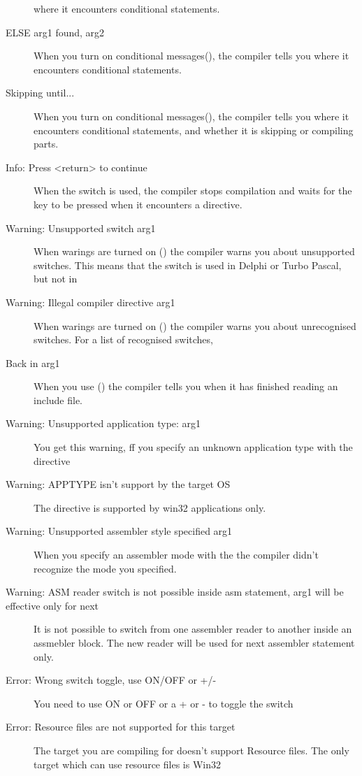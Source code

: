 \begin{description}
 where it encounters conditional statements.
\item [ELSE arg1 found, arg2]
 When you turn on conditional messages(), the compiler tells you
 where it encounters conditional statements.
\item [Skipping until...]
 When you turn on conditional messages(), the compiler tells you
 where it encounters conditional statements, and whether it is skipping or
 compiling parts.
\item [Info: Press <return> to continue]
 When the  switch is used, the compiler stops compilation
 and waits for the  key to be pressed when it encounters
 a  directive.
\item [Warning: Unsupported switch arg1]
 When warings are turned on () the compiler warns you about
 unsupported switches. This means that the switch is used in Delphi or
 Turbo Pascal, but not in \fpc
\item [Warning: Illegal compiler directive arg1]
 When warings are turned on () the compiler warns you about
 unrecognised switches. For a list of recognised switches, \progref
\item [Back in arg1]
 When you use () the compiler tells you when it has finished
 reading an include file.
\item [Warning: Unsupported application type: arg1]
 You get this warning, ff you specify an unknown application type
 with the directive 
\item [Warning: APPTYPE isn't support by the target OS]
 The  directive is supported by win32 applications only.
\item [Warning: Unsupported assembler style specified arg1]
 When you specify an assembler mode with the 
 the compiler didn't recognize the mode you specified.
\item [Warning: ASM reader switch is not possible inside asm statement, arg1 will be effective only for next]
 It is not possible to switch from one assembler reader to another
 inside an assmebler block. The new reader will be used for next
 assembler statement only.
\item [Error: Wrong switch toggle, use ON/OFF or +/-]
 You need to use ON or OFF or a + or - to toggle the switch
\item [Error: Resource files are not supported for this target]
 The target you are compiling for doesn't support Resource files. The
 only target which can use resource files is Win32

 \end{description}
